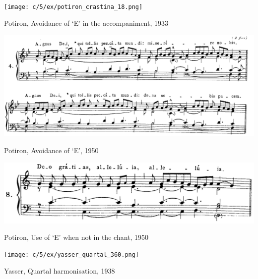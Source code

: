 \vspace*{\fill}

\begin{example}
  \centering
  \texttt{[image: c/5/ex/potiron\_crastina\_18.png]}
  \caption{Potiron, Avoidance of `E' in the accompaniment, 1933}
  \label{mus:potiron_crastina}
\end{example}

\vspace*{\fill}

\newpage

\vspace*{\fill}

\begin{example}
  \centering
  \includegraphics[width=\linewidth]{c/5/ex/potiron_kyriale_9.JPG}
  \caption{Potiron, Avoidance of `E'\kern 1pt\flat{}, 1950}
  \label{mus:potiron_kyriale_9}
\end{example}

\vspace*{\fill}

\begin{example}
  \centering
  \includegraphics[width=.9\linewidth]{c/5/ex/potiron_deo_9.JPG}
  \caption{Potiron, Use of `E' when not in the chant, 1950}
  \label{mus:potiron_deo_9}
\end{example}

\vspace*{\fill}

\newpage

\vspace*{\fill}

\begin{example}
  \centering
  \texttt{[image: c/5/ex/yasser\_quartal\_360.png]}
  \caption{Yasser, Quartal harmonisation, 1938}
  \label{mus:yasser_quartal_360}
\end{example}



